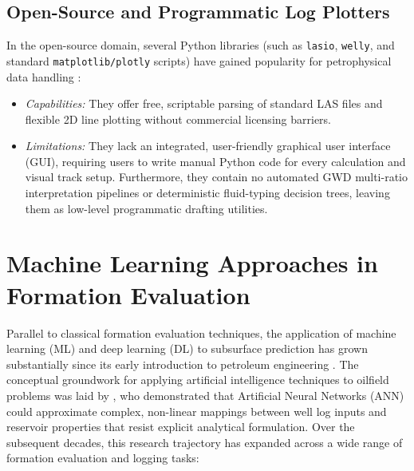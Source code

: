 \subsection{Open-Source and Programmatic Log Plotters}
In the open-source domain, several Python libraries (such as \texttt{lasio}, \texttt{welly}, and standard \texttt{matplotlib/plotly} scripts) have gained popularity for petrophysical data handling \citep{wood2020}:
\begin{itemize}
    \item \textit{Capabilities:} They offer free, scriptable parsing of standard LAS files and flexible 2D line plotting without commercial licensing barriers.
    \item \textit{Limitations:} They lack an integrated, user-friendly graphical user interface (GUI), requiring users to write manual Python code for every calculation and visual track setup. Furthermore, they contain no automated GWD multi-ratio interpretation pipelines or deterministic fluid-typing decision trees, leaving them as low-level programmatic drafting utilities.
\end{itemize}

\section{Machine Learning Approaches in Formation Evaluation}

Parallel to classical formation evaluation techniques, the application of machine learning (ML) and deep learning (DL) to subsurface prediction has grown substantially since its early introduction to petroleum engineering \citep{ref1}. The conceptual groundwork for applying artificial intelligence techniques to oilfield problems was laid by \citet{ref1}, who demonstrated that Artificial Neural Networks (ANN) could approximate complex, non-linear mappings between well log inputs and reservoir properties that resist explicit analytical formulation. Over the subsequent decades, this research trajectory has expanded across a wide range of formation evaluation and logging tasks:

